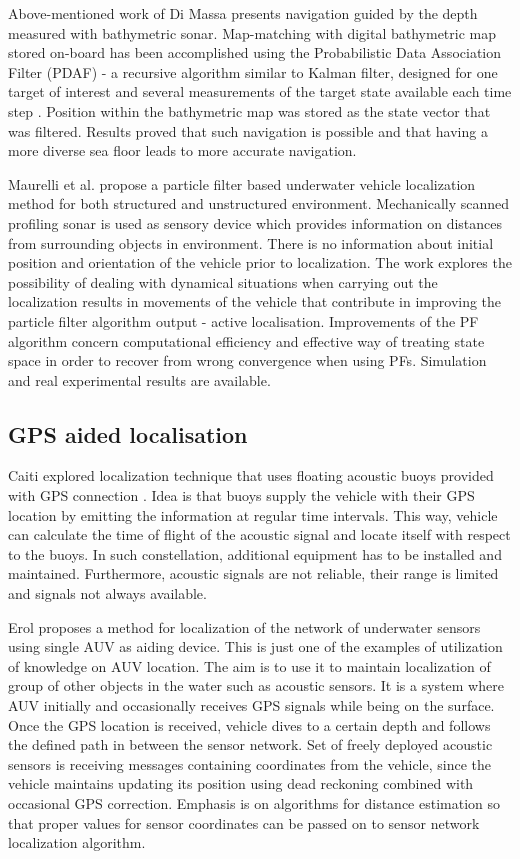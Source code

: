 Above-mentioned work of Di Massa \cite{diMassa97} presents navigation guided by the depth measured with bathymetric sonar. Map-matching with digital bathymetric map stored on-board has been accomplished using the Probabilistic Data Association Filter (PDAF) - a recursive algorithm similar to Kalman filter, designed for one target of interest and several measurements of the target state available each time step \cite{diMassa97}. Position within the bathymetric map was stored as the state vector that was filtered. Results proved that such navigation is possible and that having a more diverse sea floor leads to more accurate navigation.

Maurelli et al. \cite{maurelli08} propose a particle filter based underwater vehicle localization method for both structured and unstructured environment. Mechanically scanned profiling sonar is used as sensory device which provides information on distances from surrounding objects in environment. There is no information about initial position and orientation of the vehicle prior to localization. The work explores the possibility of dealing with dynamical situations when carrying out the localization results in movements of the vehicle that contribute in improving the particle filter algorithm output - active localisation. Improvements of the PF algorithm concern computational efficiency and effective way of treating state space in order to recover from wrong convergence when using PFs. Simulation and real experimental results are available.
\subsection{GPS aided localisation}
Caiti explored localization technique that uses floating acoustic buoys provided with GPS connection \cite{caiti05}. Idea is that buoys supply the vehicle with their GPS location by emitting the information at regular time intervals. This way, vehicle can calculate the time of flight of the acoustic signal and locate itself with respect to the buoys. In such constellation, additional equipment has to be installed and maintained. Furthermore, acoustic signals are not reliable, their range is limited and signals not always available. 

Erol \cite{erol07} proposes a method for localization of the network of underwater sensors using single AUV as aiding device. This is just one of the examples of utilization of knowledge on AUV location. The aim is to use it to maintain localization of group of other objects in the water such as acoustic sensors. It is a system where AUV initially and occasionally receives GPS signals while being on the surface. Once the GPS location is received, vehicle dives to a certain depth and follows the defined path in between the sensor network. Set of freely deployed acoustic sensors is receiving messages containing coordinates from the vehicle, since the vehicle maintains updating its position using dead reckoning combined with occasional GPS correction. Emphasis is on algorithms for distance estimation so that proper values for sensor coordinates can be passed on to sensor network localization algorithm.
